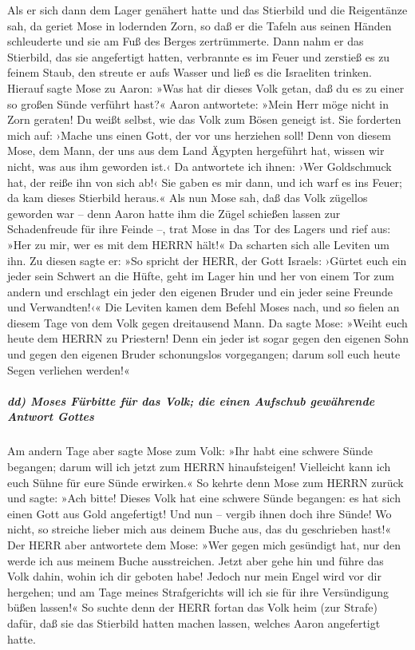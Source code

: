  Als er sich dann dem Lager genähert hatte und das
Stierbild und die Reigentänze sah, da geriet Mose in lodernden Zorn, so
daß er die Tafeln aus seinen Händen schleuderte und sie am Fuß des
Berges zertrümmerte.  Dann nahm er das Stierbild, das sie
angefertigt hatten, verbrannte es im Feuer und zerstieß es zu feinem
Staub, den streute er aufs Wasser und ließ es die Israeliten trinken.
 Hierauf sagte Mose zu Aaron: »Was hat dir dieses Volk
getan, daß du es zu einer so großen Sünde verführt hast?«
 Aaron antwortete: »Mein Herr möge nicht in Zorn geraten!
Du weißt selbst, wie das Volk zum Bösen geneigt ist.  Sie
forderten mich auf: ›Mache uns einen Gott, der vor uns herziehen soll!
Denn von diesem Mose, dem Mann, der uns aus dem Land Ägypten hergeführt
hat, wissen wir nicht, was aus ihm geworden ist.‹  Da
antwortete ich ihnen: ›Wer Goldschmuck hat, der reiße ihn von sich ab!‹
Sie gaben es mir dann, und ich warf es ins Feuer; da kam dieses
Stierbild heraus.«  Als nun Mose sah, daß das Volk
zügellos geworden war -- denn Aaron hatte ihm die Zügel schießen lassen
zur Schadenfreude für ihre Feinde --,  trat Mose in das
Tor des Lagers und rief aus: »Her zu mir, wer es mit dem HERRN hält!« Da
scharten sich alle Leviten um ihn.  Zu diesen sagte er:
»So spricht der HERR, der Gott Israels: ›Gürtet euch ein jeder sein
Schwert an die Hüfte, geht im Lager hin und her von einem Tor zum andern
und erschlagt ein jeder den eigenen Bruder und ein jeder seine Freunde
und Verwandten!‹«  Die Leviten kamen dem Befehl Moses
nach, und so fielen an diesem Tage von dem Volk gegen dreitausend Mann.
 Da sagte Mose: »Weiht euch heute dem HERRN zu Priestern!
Denn ein jeder ist sogar gegen den eigenen Sohn und gegen den eigenen
Bruder schonungslos vorgegangen; darum soll euch heute Segen verliehen
werden!«

\hypertarget{dd-moses-fuxfcrbitte-fuxfcr-das-volk-die-einen-aufschub-gewuxe4hrende-antwort-gottes}{%
\subparagraph{dd) Moses Fürbitte für das Volk; die einen Aufschub
gewährende Antwort
Gottes}\label{dd-moses-fuxfcrbitte-fuxfcr-das-volk-die-einen-aufschub-gewuxe4hrende-antwort-gottes}}

 Am andern Tage aber sagte Mose zum Volk: »Ihr habt eine
schwere Sünde begangen; darum will ich jetzt zum HERRN hinaufsteigen!
Vielleicht kann ich euch Sühne für eure Sünde erwirken.« 
So kehrte denn Mose zum HERRN zurück und sagte: »Ach bitte! Dieses Volk
hat eine schwere Sünde begangen: es hat sich einen Gott aus Gold
angefertigt!  Und nun -- vergib ihnen doch ihre Sünde! Wo
nicht, so streiche lieber mich aus deinem Buche aus, das du geschrieben
hast!«  Der HERR aber antwortete dem Mose: »Wer gegen
mich gesündigt hat, nur den werde ich aus meinem Buche ausstreichen.
 Jetzt aber gehe hin und führe das Volk dahin, wohin ich
dir geboten habe! Jedoch nur mein Engel wird vor dir hergehen; und am
Tage meines Strafgerichts will ich sie für ihre Versündigung büßen
lassen!«  So suchte denn der HERR fortan das Volk heim
(zur Strafe) dafür, daß sie das Stierbild hatten machen lassen, welches
Aaron angefertigt hatte.

